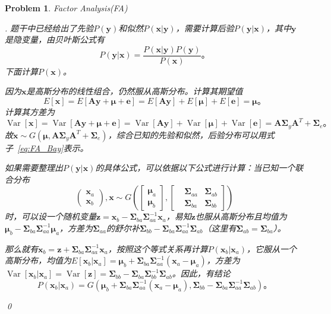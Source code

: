 \documentclass[UTF8]{article}
\newtheorem{hw}{Problem}
\newenvironment{sol}
  {\par\vspace{3mm}\noindent{\it Solution}.}
  {\qed}
\DeclareMathOperator{\var}{Var}
\newcommand{\Amat}{{\boldsymbol A}}
\newcommand{\ev}[0]{{\boldsymbol{e}}}
\newcommand{\xv}{\boldsymbol{x}}
\newcommand{\yv}{\boldsymbol{y}}
\newcommand{\zv}{\boldsymbol{z}}
\newcommand{\Sigmamat}{\boldsymbol{\Sigma}}
\newcommand{\muv}{\boldsymbol{\mu}}
\begin{document}
\begin{hw}
	Factor Analysis(FA) 
	
	\begin{sol}
		题干中已经给出了先验$P(\yv)$和似然$P(\xv|\yv)$，需要计算后验$P(\yv|\xv)$，其中$\yv$是隐变量，由贝叶斯公式有
		\begin{equation}
			\label{eq:FA_Bay}
			P(\yv|\xv) = \frac{P(\xv|\yv)P(\yv)}{P(\xv)}。
		\end{equation}
		下面计算$P(\xv)$。
		
		因为$\xv$是高斯分布的线性组合，仍然服从高斯分布。计算其期望值
		\begin{equation}
			\label{eq:FA_E}
			E[\xv] = E[\Amat\yv+\muv+\ev] = E[\Amat\yv]+E[\muv]+E[\ev]=\muv。
		\end{equation}
		计算其方差为
		\begin{equation}
		\label{eq:FA_Var}
		\var[\xv] = \var[\Amat\yv+\muv+\ev] = \var[\Amat\yv]+\var[\muv]+\var[\ev]=\Amat\Sigmamat_y\Amat^T+\Sigmamat_e。
		\end{equation}
		故$\xv\sim G(\muv,\Amat\Sigmamat_y\Amat^T+\Sigmamat_e)$，综合已知的先验和似然，后验分布可以用式子~\eqref{eq:FA_Bay}表示。
		
		如果需要整理出$P(\yv|\xv)$的具体公式，可以依据以下公式进行计算：当已知一个联合分布
		\begin{equation}
			\label{eq:FA_uni}
			\left(
				\begin{aligned}
					\xv_a \\
					\xv_b
				\end{aligned}
			\right)
			,\xv\sim G
			\left(
				\left[	
					\begin{aligned}
					\muv_a \\
					\muv_b
					\end{aligned}
				\right],
				\left[
					\begin{aligned}
					&\Sigmamat_{aa} & \Sigmamat_{ab} \\
					&\Sigmamat_{ba} & \Sigmamat_{bb}
					\end{aligned}
				\right]
			\right)
		\end{equation}
		时，可以设一个随机变量$\zv=\xv_b-\Sigmamat_{ba}\Sigmamat_{aa}^{-1}\xv_a$，易知$\zv$也服从高斯分布且均值为$\muv_b-\Sigmamat_{ba}\Sigmamat_{aa}^{-1}\muv_a$，方差为$\Sigmamat_{aa}$的舒尔补$\Sigmamat_{bb}-\Sigmamat_{ba}\Sigmamat_{aa}^{-1}\Sigmamat_{ab}$（这里有$\Sigmamat_{ab}=\Sigmamat_{ba}$）。
		
		那么就有$\xv_b=\zv+\Sigmamat_{ba}\Sigmamat_{aa}^{-1}\xv_a$，按照这个等式关系再计算$P(\xv_b|\xv_a)$，它服从一个高斯分布，均值为$E[\xv_b|\xv_a]=\muv_b+\Sigmamat_{ba}\Sigmamat_{aa}^{-1}(\xv_a-\muv_a)$，方差为$\var[\xv_b|\xv_a]=\var[\zv]=\Sigmamat_{bb}-\Sigmamat_{ba}\Sigmamat_{bb}^{-1}\Sigmamat_{ab}$。因此，有结论
		\begin{equation}
			\label{eq:conclusion}
			P(\xv_b|\xv_a)=G(\muv_b+\Sigmamat_{ba}\Sigmamat_{aa}^{-1}(\xv_a-\muv_a),\Sigmamat_{bb}-\Sigmamat_{ba}\Sigmamat_{aa}^{-1}\Sigmamat_{ab})。
		\end{equation}
		

\end{sol}
\end{hw}
\end{document}
